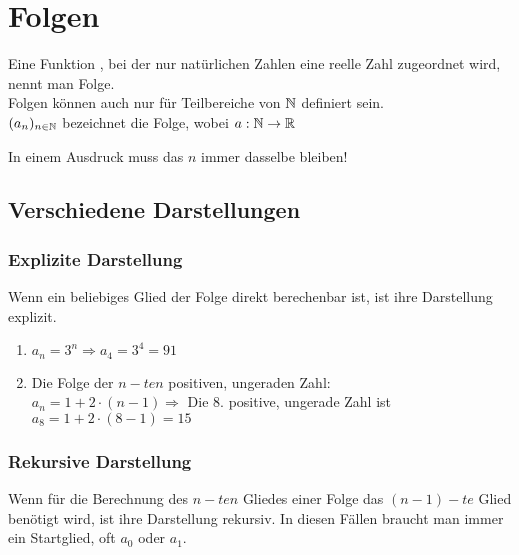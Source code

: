 \chapter{Folgen}

\begin{Definition}
Eine Funktion , bei der nur natürlichen Zahlen eine reelle Zahl zugeordnet wird, nennt man Folge.\\
Folgen können auch nur für Teilbereiche von $\mathbb{N}$ definiert sein.\\
$(a_{n})_{n\in\mathbb{N}}$ bezeichnet die Folge, wobei $a:\mathbb{N}\rightarrow\mathbb{R}$
\end{Definition}

\begin{Bemerkung}
In einem Ausdruck muss das $n$ immer dasselbe bleiben!
\end{Bemerkung}
		\section{Verschiedene Darstellungen}


	\subsection{Explizite Darstellung}

\begin{Definition}
Wenn ein beliebiges Glied der Folge direkt berechenbar ist, ist ihre Darstellung explizit.
\end{Definition}

\begin{Beispiel}
\begin{enumerate}
\item  $a_{n}=3^n \Rightarrow a_{4}=3^4=91$
\item Die Folge der $n-ten$ positiven, ungeraden Zahl:\\
$a_{n}=1+2\cdot(n-1) \Rightarrow$ Die 8. positive, ungerade Zahl ist $ a_{8}=1+2\cdot(8-1)=15$
\end{enumerate}
\end{Beispiel}


	\subsection{Rekursive Darstellung}

\begin{Definition}
Wenn für die Berechnung des $n-ten$ Gliedes einer Folge das $(n-1)-te$ Glied benötigt wird, ist ihre Darstellung rekursiv.
In diesen Fällen braucht man immer ein Startglied, oft $a_{0}$ oder $ a_{1}$.
\end{Definition}

